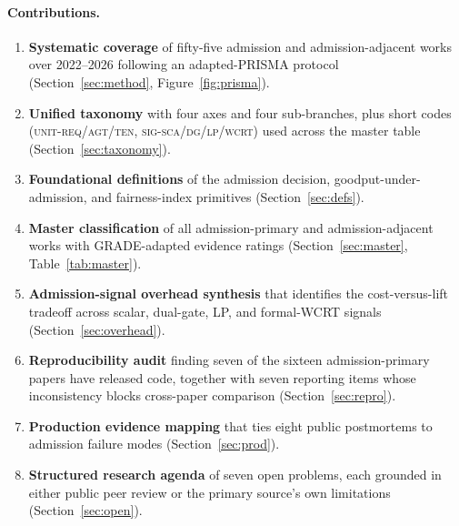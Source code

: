 \documentclass[10pt]{article} %
\theoremstyle{definition}
\begin{document}
\paragraph{Contributions.}
\begin{enumerate}[leftmargin=1.5em, itemsep=2pt]
\item \textbf{Systematic coverage} of fifty-five admission and
      admission-adjacent works over 2022--2026 following an
      adapted-PRISMA protocol (Section~\ref{sec:method},
      Figure~\ref{fig:prisma}).
\item \textbf{Unified taxonomy} with four axes and four sub-branches,
      plus short codes (\textsc{unit-req/agt/ten},
      \textsc{sig-sca/dg/lp/wcrt}) used across the master table
      (Section~\ref{sec:taxonomy}).
\item \textbf{Foundational definitions} of the admission decision,
      goodput-under-admission, and fairness-index primitives
      (Section~\ref{sec:defs}).
\item \textbf{Master classification} of all admission-primary and
      admission-adjacent works with GRADE-adapted evidence ratings
      (Section~\ref{sec:master}, Table~\ref{tab:master}).
\item \textbf{Admission-signal overhead synthesis} that identifies the
      cost-versus-lift tradeoff across scalar, dual-gate, LP, and
      formal-WCRT signals (Section~\ref{sec:overhead}).
\item \textbf{Reproducibility audit} finding seven of the sixteen
      admission-primary papers have released code, together with seven
      reporting items whose inconsistency blocks cross-paper comparison
      (Section~\ref{sec:repro}).
\item \textbf{Production evidence mapping} that ties eight public
      postmortems to admission failure modes (Section~\ref{sec:prod}).
\item \textbf{Structured research agenda} of seven open problems, each
      grounded in either public peer review or the primary source's
      own limitations (Section~\ref{sec:open}).
\end{enumerate}
\end{document}
